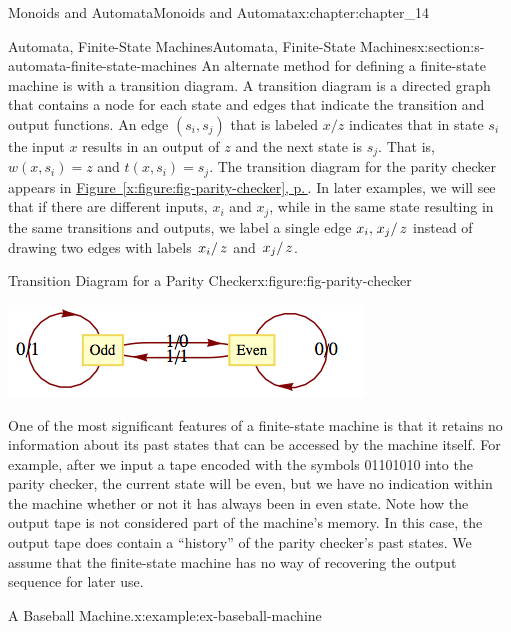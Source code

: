 \documentclass[twoside,10pt,]{book}
\newcommand{\xreffont}{\relax}
\numberwithin{equation}{section}
\begin{document}
\begin{chapterptx}{Monoids and Automata}{}{Monoids and Automata}{}{}{x:chapter:chapter_14}
\begin{sectionptx}{Automata, Finite-State Machines}{}{Automata, Finite-State Machines}{}{}{x:section:s-automata-finite-state-machines}
An alternate method for defining a finite-state machine is with a transition diagram. A transition diagram is a directed graph that contains a node for each state and edges that indicate the transition and output functions. An edge \(\left(s_i,s_j\right)\) that is labeled \(x/z\) indicates that in state \(s_i\) the input \(x\) results in an output of \(z\) and the next state is \(s_j\). That is, \(w\left(x, s_i\right)=z\) and \(t\left(x, s_i\right)=s_j\). The transition diagram for the parity checker appears in \hyperref[x:figure:fig-parity-checker]{Figure~{\xreffont\ref{x:figure:fig-parity-checker}}, p.\,\pageref{x:figure:fig-parity-checker}}. In later examples, we will see that if there are different inputs, \(x_i\) and \(x_j\), while in the same state resulting in the same transitions and outputs, we label a single edge \(x_i, \left.x_j\right/z\) instead of drawing two edges with labels \(\left.x_i\right/z\) and \(\left.x_j\right/z\).%
\begin{figureptx}{Transition Diagram for a Parity Checker}{x:figure:fig-parity-checker}{}%
\begin{image}{0.1}{0.8}{0.1}%
\includegraphics[width=\linewidth]{images/fig-parity-checker.png}
\end{image}%
\tcblower
\end{figureptx}%
One of the most significant features of a finite-state machine is that it retains no information about its past states that can be accessed by the machine itself. For example, after we input a tape encoded with the symbols 01101010 into the parity checker, the current state will be even, but we have no indication within the machine whether or not it has always been in even state. Note how the output tape is not considered part of the machine's memory. In this case, the output tape does contain a ``history'' of the parity checker's past states. We  assume that the finite-state machine has no way of recovering the output sequence for later use.%
\begin{example}{A Baseball Machine.}{x:example:ex-baseball-machine}%

\end{example}
\end{sectionptx}
\end{chapterptx}
\end{document}
